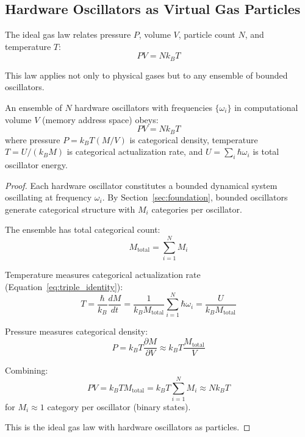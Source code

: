 \subsection{Hardware Oscillators as Virtual Gas Particles}

The ideal gas law relates pressure $P$, volume $V$, particle count $N$, and temperature $T$:
\begin{equation}
PV = Nk_B T
\end{equation}

This law applies not only to physical gases but to any ensemble of bounded oscillators.

\begin{theorem}
\label{thm:hardware_gas}
An ensemble of $N$ hardware oscillators with frequencies $\{\omega_i\}$ in computational volume $V$ (memory address space) obeys:
\begin{equation}
PV = Nk_B T
\end{equation}
where pressure $P = k_B T(M/V)$ is categorical density, temperature $T = U/(k_B M)$ is categorical actualization rate, and $U = \sum_i \hbar\omega_i$ is total oscillator energy.
\end{theorem}

\begin{proof}
Each hardware oscillator constitutes a bounded dynamical system oscillating at frequency $\omega_i$. By Section~\ref{sec:foundation}, bounded oscillators generate categorical structure with $M_i$ categories per oscillator.

The ensemble has total categorical count:
\begin{equation}
M_{\text{total}} = \sum_{i=1}^{N} M_i
\end{equation}

Temperature measures categorical actualization rate (Equation~\ref{eq:triple_identity}):
\begin{equation}
T = \frac{\hbar}{k_B} \frac{dM}{dt} = \frac{1}{k_B M_{\text{total}}} \sum_{i=1}^{N} \hbar\omega_i = \frac{U}{k_B M_{\text{total}}}
\end{equation}

Pressure measures categorical density:
\begin{equation}
P = k_B T \frac{\partial M}{\partial V} \approx k_B T \frac{M_{\text{total}}}{V}
\end{equation}

Combining:
\begin{equation}
PV = k_B T M_{\text{total}} = k_B T \sum_{i=1}^{N} M_i \approx Nk_B T
\end{equation}
for $M_i \approx 1$ category per oscillator (binary states).

This is the ideal gas law with hardware oscillators as particles.
\end{proof}

